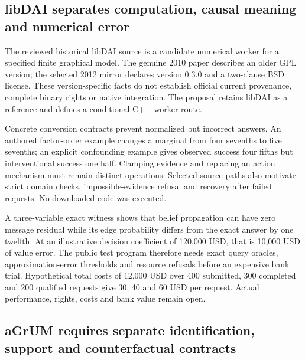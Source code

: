 \hypertarget{libdai-separates-computation-causal-meaning-and-numerical-error}{%
\subsection{libDAI separates computation, causal meaning and numerical
error}\label{libdai-separates-computation-causal-meaning-and-numerical-error}}

The reviewed historical libDAI source is a candidate numerical worker
for a specified finite graphical model. The genuine 2010 paper describes
an older GPL version; the selected 2012 mirror declares version 0.3.0
and a two-clause BSD license. These version-specific facts do not
establish official current provenance, complete binary rights or native
integration. The proposal retains libDAI as a reference and defines a
conditional C++ worker route.
\citep{exec24_libdai_paper,exec24_libdai_source,exec24_libdai_choice}

Concrete conversion contracts prevent normalized but incorrect answers.
An authored factor-order example changes a marginal from four sevenths
to five sevenths; an explicit confounding example gives observed success
four fifths but interventional success one half. Clamping evidence and
replacing an action mechanism must remain distinct operations. Selected
source paths also motivate strict domain checks, impossible-evidence
refusal and recovery after failed requests. No downloaded code was
executed. \citep{exec24_libdai_source,exec24_libdai_choice}

A three-variable exact witness shows that belief propagation can have
zero message residual while its edge probability differs from the exact
answer by one twelfth. At an illustrative decision coefficient of
120,000 USD, that is 10,000 USD of value error. The public test program
therefore needs exact query oracles, approximation-error thresholds and
resource refusals before an expensive bank trial. Hypothetical total
costs of 12,000 USD over 400 submitted, 300 completed and 200 qualified
requests give 30, 40 and 60 USD per request. Actual performance, rights,
costs and bank value remain open. \citep{exec24_libdai_choice}

\hypertarget{agrum-requires-separate-identification-support-and-counterfactual-contracts}{%
\subsection{aGrUM requires separate identification, support and
counterfactual
contracts}\label{agrum-requires-separate-identification-support-and-counterfactual-contracts}}

